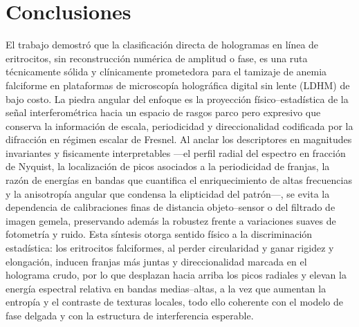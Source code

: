 \chapter{Conclusiones}
\label{chap:conclusiones}

El trabajo demostró que la clasificación directa de hologramas en línea de eritrocitos, sin reconstrucción numérica de amplitud o fase, es una ruta técnicamente sólida y clínicamente prometedora para el tamizaje de anemia falciforme en plataformas de microscopía holográfica digital sin lente (LDHM) de bajo costo. La piedra angular del enfoque es la proyección físico–estadística de la señal interferométrica hacia un espacio de rasgos parco pero expresivo que conserva la información de escala, periodicidad y direccionalidad codificada por la difracción en régimen escalar de Fresnel. Al anclar los descriptores en magnitudes invariantes y fisi\-camente interpretables —el perfil radial del espectro en fracción de Nyquist, la localización de picos asociados a la periodicidad de franjas, la razón de energías en bandas que cuantifica el enriquecimiento de altas frecuencias y la anisotropía angular que condensa la elipticidad del patrón—, se evita la dependencia de calibraciones finas de distancia objeto–sensor o del filtrado de imagen gemela, preservando además la robustez frente a variaciones suaves de fotometría y ruido. Esta síntesis otorga sentido físico a la discriminación estadística: los eritrocitos falciformes, al perder circularidad y ganar rigidez y elongación, inducen franjas más juntas y direccionalidad marcada en el holograma crudo, por lo que desplazan hacia arriba los picos radiales y elevan la energía espectral relativa en bandas medias–altas, a la vez que aumentan la entropía y el contraste de texturas locales, todo ello coherente con el modelo de fase delgada y con la estructura de interferencia esperable.

